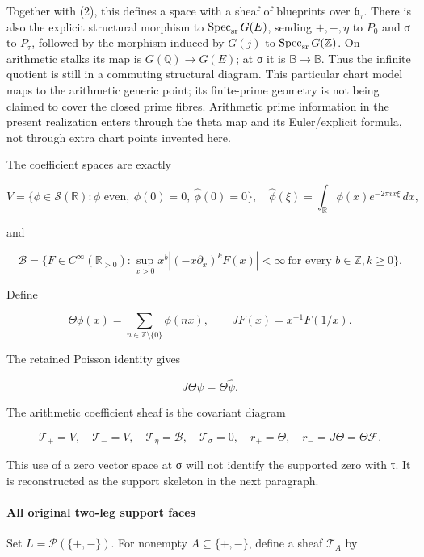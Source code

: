 \documentclass{article}
\begin{document}
Together with (2), this defines a space with a sheaf of blueprints over \(\mathfrak b_\tau\). There is also the explicit structural morphism to \(\operatorname{Spec}_{\rm sr}G(E)\), sending \(+, -,\eta\) to \(P_0\) and σ to \(P_\tau\), followed by the morphism induced by \(G(j)\) to \(\operatorname{Spec}_{\rm sr}G(\mathbb Z)\). On arithmetic stalks its map is \(G(\mathbb Q)\to G(E)\); at σ it is \(\mathbb B\to\mathbb B\). Thus the infinite quotient is still in a commuting structural diagram. This particular chart model maps to the arithmetic generic point; its finite-prime geometry is not being claimed to cover the closed prime fibres. Arithmetic prime information in the present realization enters through the theta map and its Euler/explicit formula, not through extra chart points invented here.

The coefficient spaces are exactly

\[
V=\{\phi\in\mathcal S(\mathbb R):\phi\text{ even},\ \phi(0)=0,\ \widehat\phi(0)=0\},
\quad
\widehat\phi(\xi)=\int_{\mathbb R}\phi(x)e^{-2\pi i x\xi}\,dx,
\tag{10}
\]

and

\[
\mathscr B=\{F\in C^\infty(\mathbb R_{>0}):
\sup_{x>0}x^b|(-x\partial_x)^kF(x)|<\infty
\ \text{for every }b\in\mathbb Z,k\ge0\}.
\tag{11}
\]

Define

\[
\Theta\phi(x)=\sum_{n\in\mathbb Z\setminus\{0\}}\phi(nx),
\qquad JF(x)=x^{-1}F(1/x).
\tag{12}
\]

The retained Poisson identity gives

\[
J\Theta\psi=\Theta\widehat\psi.
\tag{13}
\]

The arithmetic coefficient sheaf is the covariant diagram

\[
\mathcal T_+=V,\quad\mathcal T_-=V,\quad
\mathcal T_\eta=\mathscr B,\quad\mathcal T_\sigma=0,
\quad r_+=\Theta,\quad r_-=J\Theta=\Theta\mathcal F.
\tag{14}
\]

This use of a zero vector space at σ will not identify the supported zero with τ. It is reconstructed as the support skeleton in the next paragraph.

\paragraph{All original two-leg support faces}\label{endpoint-tau_base--all-original-two-leg-support-faces}

Set \(L=\mathcal P(\{+,-\})\). For nonempty \(A\subseteq\{+,-\}\), define a sheaf \(\mathcal T_A\) by
\end{document}
